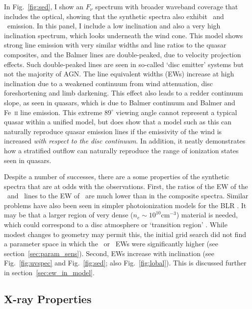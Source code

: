 In Fig.~\ref{fig:sed}, I show an $F_{\nu}$ spectrum with broader waveband coverage
that includes the optical, showing that the synthetic spectra 
also exhibit \ha\ and \hb\ emission. 
In this panel, I include a low inclination and 
also a very high inclination 
spectrum, which looks underneath the wind cone. This model shows 
strong line emission with very similar widths and line ratios to the quasar composites, and
the Balmer lines are double-peaked, due to velocity projection effects.  
Such double-peaked lines are seen in so-called `disc emitter' systems 
\citep[e.g.][]{eracleous1994} but not the majority of AGN.     
The line equivalent widths (EWs) increase at high inclination
due to a weakened continuum from wind attenuation, 
disc foreshortening and limb darkening. This effect also 
leads to a redder continuum slope, as seen in quasars, which is
due to Balmer continuum and Balmer and Fe~\textsc{ii} line emission.
This extreme $89^\circ$ viewing angle cannot represent a typical quasar within a unified model,
but does show that a model such as this can naturally reproduce quasar emission lines
if the emissivity of the wind is increased {\em with respect to the disc continuum}.
In addition, it neatly demonstrates how a stratified outflow can naturally
reproduce the range of ionization states seen in quasars. 

Despite a number of successes, 
there are a some properties of the synthetic spectra
that are at odds with the observations. First, the ratios of the 
EW of the \la\ and \mgline\ lines
to the EW of \civline\ are much lower than in the composite spectra. 
Similar problems have also been seen in simpler photoionization models for the 
BLR \citep{netzer1990}.
It may be that a larger region of very dense ($n_e\sim10^{10}$cm$^{-3}$) 
material is needed, which could correspond to a disc atmosphere or 
`transition region' 
\citep[see e.g.][]{MCGV95,knigge1998}. \nocite{knigge1998} 
While modest changes to geometry may permit this, the initial grid search 
did not find a parameter space in which the \la\ or \mg\ EWs
were significantly higher (see section~\ref{sec:param_sens}). 
Second, EWs increase with inclination 
(see Fig.~\ref{fig:uvspec} and Fig.~\ref{fig:sed}; also Fig.~\ref{fig:lobal}).
This is discussed further in section~\ref{sec:ew_in_model}.

\subsection{X-ray Properties}
\label{sec:xray}


